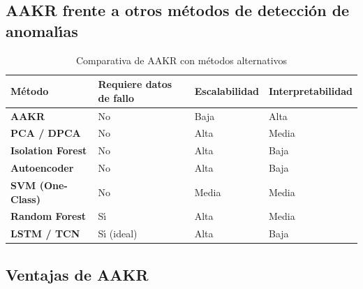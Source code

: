 \documentclass[12pt,a4paper]{article}
\begin{document}
\subsection{AAKR frente a otros m\'etodos de detecci\'on de anomal\'{\i}as}

\begin{table}[H]
\centering
\caption{Comparativa de AAKR con m\'etodos alternativos}
\label{tab:comparison}
\renewcommand{\arraystretch}{1.45}
\begin{tabularx}{\linewidth}{>{\bfseries}p{3cm}
                              >{\centering}X
                              >{\centering}X
                              >{\centering\arraybackslash}X}
\toprule
\rowcolor{azulTDS!15}
M\'etodo & Requiere datos de fallo & Escalabilidad & Interpretabilidad \\
\midrule
AAKR & No & Baja & Alta \\
\rowcolor{grisClaro}
PCA / DPCA & No & Alta & Media \\
Isolation Forest & No & Alta & Baja \\
\rowcolor{grisClaro}
Autoencoder & No & Alta & Baja \\
SVM (One-Class) & No & Media & Media \\
\rowcolor{grisClaro}
Random Forest & S\'{\i} & Alta & Media \\
LSTM / TCN & S\'{\i} (ideal) & Alta & Baja \\
\bottomrule
\end{tabularx}
\end{table}

\subsection{Ventajas de AAKR}
\end{document}
